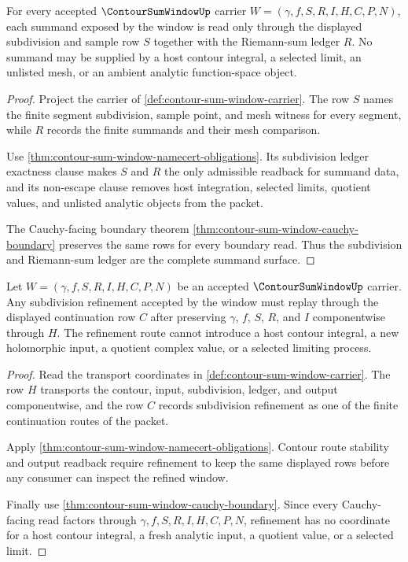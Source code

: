 \begin{theorem}
\label{thm:contour-sum-window-subdivision-exactness}
For every accepted $\ContourSumWindowUp$ carrier $W=(\gamma,f,S,R,I,H,C,P,N)$, each summand exposed by the window is read only through the displayed subdivision and sample row $S$ together with the Riemann-sum ledger $R$. No summand may be supplied by a host contour integral, a selected limit, an unlisted mesh, or an ambient analytic function-space object.
\end{theorem}
\begin{proof}
Project the carrier of \autoref{def:contour-sum-window-carrier}. The row $S$ names the finite segment subdivision, sample point, and mesh witness for every segment, while $R$ records the finite summands and their mesh comparison.

Use \autoref{thm:contour-sum-window-namecert-obligations}. Its subdivision ledger exactness clause makes $S$ and $R$ the only admissible readback for summand data, and its non-escape clause removes host integration, selected limits, quotient values, and unlisted analytic objects from the packet.

The Cauchy-facing boundary theorem \autoref{thm:contour-sum-window-cauchy-boundary} preserves the same rows for every boundary read. Thus the subdivision and Riemann-sum ledger are the complete summand surface.
\end{proof}

\begin{theorem}
\label{thm:contour-sum-window-refinement-stability}
Let $W=(\gamma,f,S,R,I,H,C,P,N)$ be an accepted $\ContourSumWindowUp$ carrier. Any subdivision refinement accepted by the window must replay through the displayed continuation row $C$ after preserving $\gamma$, $f$, $S$, $R$, and $I$ componentwise through $H$. The refinement route cannot introduce a host contour integral, a new holomorphic input, a quotient complex value, or a selected limiting process.
\end{theorem}
\begin{proof}
Read the transport coordinates in \autoref{def:contour-sum-window-carrier}. The row $H$ transports the contour, input, subdivision, ledger, and output componentwise, and the row $C$ records subdivision refinement as one of the finite continuation routes of the packet.

Apply \autoref{thm:contour-sum-window-namecert-obligations}. Contour route stability and output readback require refinement to keep the same displayed rows before any consumer can inspect the refined window.

Finally use \autoref{thm:contour-sum-window-cauchy-boundary}. Since every Cauchy-facing read factors through $\gamma,f,S,R,I,H,C,P,N$, refinement has no coordinate for a host contour integral, a fresh analytic input, a quotient value, or a selected limit.
\end{proof}

